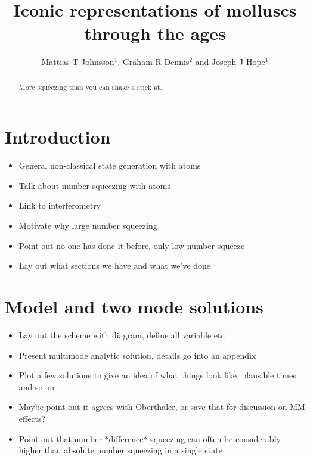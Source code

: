 \documentclass[12pt]{iopart}
\begin{document}
\title{Iconic representations of molluscs through the ages}

\author{Mattias T Johnsson$^1$, Graham R Dennis$^2$ and Joseph J Hope$^1$}

\address{$^1$Department of Quantum Science, Research School of Physics and Engineering, The Australian National University, Canberra ACT 0200, Australia}
\address{$^2$Plasma Research Laboratory, Research School of Physics and Engineering, The Australian National University, Canberra ACT 0200, Australia}

\begin{abstract}
More squeezing than you can shake a stick at.

\end{abstract}

\maketitle

\section{Introduction}
\label{sectionIntroduction}
\begin{itemize}
  \item General non-classical state generation with atoms
  \item Talk about number squeezing with atoms
  \item Link to interferometry
  \item Motivate why large number squeezing
  \item Point out no one has done it before, only low number squeeze
  \item Lay out what sections we have and what we've done
\end{itemize}

\section{Model and two mode solutions}
\label{secTwoModeAnalytic}
\begin{itemize}
  \item Lay out the scheme with diagram, define all variable etc
  \item Present multimode analytic solution, details go into an appendix
  \item Plot a few solutions to give an idea of what things look like, plausible times and so on
  \item Maybe point out it agrees with Oberthaler, or save that for discussion on MM effects?
  \item Point out that number *difference* squeezing can often be considerably higher than absolute number squeezing in a single state
\end{itemize}
\end{document}
